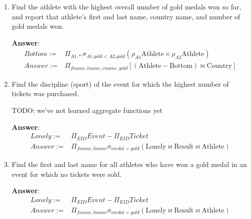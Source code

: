 \documentclass{article}
\begin{document}
\begin{enumerate}
\item   %
Find the athlete with the highest overall number of gold medals won so far, and report that athlete's first and last name, country name, and number of gold medals won.

{\bf Answer}:\\[5pt]
\begin{equation}
\begin{aligned}
Bottom := & \Pi_{A1.*} \sigma_{A1.gold < A2.gold} (\rho_{A1} \mathrm{Athlete} \times \rho_{A2} \mathrm{Athlete}) \\
Answer := & \Pi_{fname, lname, cname, gold} [(\mathrm{Athlete} - \mathrm{Bottom}) \bowtie \mathrm{Country}]
\end{aligned}
\end{equation}

\item   %
Find the discipline (sport) of the event for which the highest number of tickets was purchased.

TODO: we've not learned aggregate functions yet

{\bf Answer}:\\[5pt]
\begin{equation}
\begin{aligned}
Lonely := & \Pi_{EID} Event - \Pi_{EID} Ticket\\
Answer := & \Pi_{fname, lname} \sigma_{medal=gold} (\mathrm{Lonely} \bowtie \mathrm{Result} \bowtie \mathrm{Athlete})
\end{aligned}
\end{equation}

\item   %
Find the first and last name for all athletes who have won a gold medal in an event for which no tickets were sold.

{\bf Answer}:\\[5pt]
\begin{equation}
\begin{aligned}
Lonely := & \Pi_{EID} Event - \Pi_{EID} Ticket\\
Answer := & \Pi_{fname, lname} \sigma_{medal=gold} (\mathrm{Lonely} \bowtie \mathrm{Result} \bowtie \mathrm{Athlete})
\end{aligned}
\end{equation}

\end{enumerate}



\end{document}
